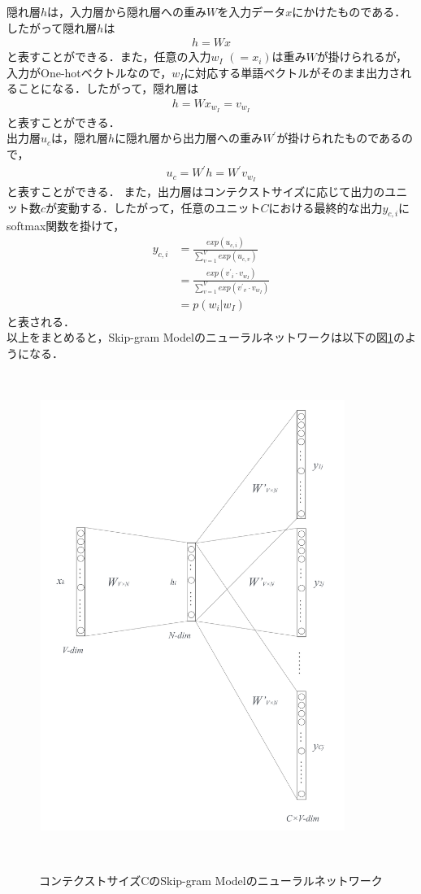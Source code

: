 隠れ層$ h $は，入力層から隠れ層への重み$ W $を入力データ$ x $にかけたものである．したがって隠れ層$ h $は
\begin{align}
h = Wx \nonumber
\end{align}
と表すことができる．また，任意の入力$ w_{I} $ $ (= x_{i}) $は重み$ W $が掛けられるが，入力がOne-hotベクトルなので，$ w_{I} $に対応する単語ベクトルがそのまま出力されることになる．したがって，隠れ層は
\begin{align}
h = Wx_{w_{I}} = v_{w_{I}} \nonumber
\end{align}
と表すことができる．\\
出力層$ u_{c} $は，隠れ層$ h $に隠れ層から出力層への重み$ W^{\prime} $が掛けられたものであるので，
\begin{align}
u_{c} = W^{\prime}h = W^{\prime}v_{w_{I}} \nonumber
\end{align}
と表すことができる．
また，出力層はコンテクストサイズに応じて出力のユニット数$ c $が変動する．したがって，任意のユニット$ C $における最終的な出力$ y_{c,i} $にsoftmax関数を掛けて，
\begin{align}
y_{c,i} &= \frac{exp(u_{c,i})}{\sum_{v=1}^{V}exp(u_{c,v})} \nonumber \\
        &= \frac{exp({v^{\prime}}_{i} \cdot v_{w_{I}})}{\sum_{v=1}^{V}exp({v^{\prime}}_{v} \cdot v_{w_{I}})} \nonumber \\
        &= p(w_{i}|w_{I}) \nonumber
\end{align}
と表される．\\
以上をまとめると，Skip-gram Modelのニューラルネットワークは以下の図\ref{fig:neuralnet}のようになる．
\begin{figure}[htbp]
　\begin{center}
   \includegraphics[width=100mm,height=140mm]{figures/skip-gram.pdf}
   \caption{コンテクストサイズCのSkip-gram Modelのニューラルネットワーク}
   \label{fig:neuralnet}
　\end{center}
\end{figure}

